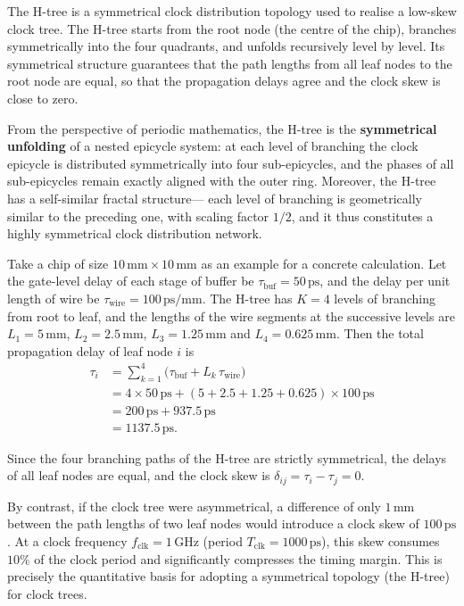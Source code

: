 \begin{example}
\label{ex:h_tree_clock}
The H-tree is a symmetrical clock distribution topology used to realise a low-skew clock tree.
The H-tree starts from the root node (the centre of the chip), branches symmetrically into the four quadrants,
and unfolds recursively level by level.
Its symmetrical structure guarantees that the path lengths from all leaf nodes to the root node are equal,
so that the propagation delays agree and the clock skew is close to zero.

From the perspective of periodic mathematics, the H-tree is the \textbf{symmetrical unfolding} of a nested epicycle system:
at each level of branching the clock epicycle is distributed symmetrically into four sub-epicycles,
and the phases of all sub-epicycles remain exactly aligned with the outer ring.
Moreover, the H-tree has a self-similar fractal structure---
each level of branching is geometrically similar to the preceding one, with scaling factor $1/2$,
and it thus constitutes a highly symmetrical clock distribution network.

Take a chip of size $10\,\text{mm} \times 10\,\text{mm}$ as an example for a concrete calculation.
Let the gate-level delay of each stage of buffer be $\tau_{\text{buf}} = 50\,\text{ps}$,
and the delay per unit length of wire be $\tau_{\text{wire}} = 100\,\text{ps/mm}$.
The H-tree has $K = 4$ levels of branching from root to leaf,
and the lengths of the wire segments at the successive levels are
$L_1 = 5\,\text{mm}$,
$L_2 = 2.5\,\text{mm}$,
$L_3 = 1.25\,\text{mm}$ and
$L_4 = 0.625\,\text{mm}$.
Then the total propagation delay of leaf node $i$ is
\[
\begin{aligned}
\tau_i
&= \sum_{k=1}^{4}\bigl(\tau_{\text{buf}} + L_k\,\tau_{\text{wire}}\bigr) \\
&= 4 \times 50\,\text{ps}
   + (5 + 2.5 + 1.25 + 0.625)\times 100\,\text{ps} \\
&= 200\,\text{ps} + 937.5\,\text{ps} \\
&= 1137.5\,\text{ps}.
\end{aligned}
\]

Since the four branching paths of the H-tree are strictly symmetrical,
the delays of all leaf nodes are equal,
and the clock skew is $\delta_{ij} = \tau_i - \tau_j = 0$.

By contrast, if the clock tree were asymmetrical,
a difference of only $1\,\text{mm}$ between the path lengths of two leaf nodes
would introduce a clock skew of $100\,\text{ps}$.
At a clock frequency $f_{\text{clk}} = 1\,\text{GHz}$
(period $T_{\text{clk}} = 1000\,\text{ps}$),
this skew consumes $10\%$ of the clock period
and significantly compresses the timing margin.
This is precisely the quantitative basis for adopting a symmetrical topology (the H-tree) for clock trees.
\end{example}


